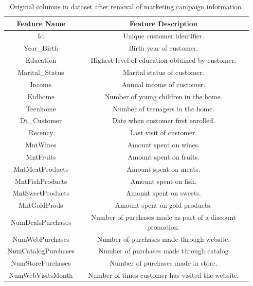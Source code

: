 \documentclass[twocolumn]{article}
\begin{document}
\begin{table}
    \centering
        \begin{tabular}{|c|c|}
            \hline
            \textbf{Feature Name} & \textbf{Feature Description} \\
            \hline
            Id & Unique customer identifier. \\
            Year\_Birth & Birth year of customer. \\
            Education & Highest level of education obtained by customer. \\
            Marital\_Status & Marital status of customer. \\
            Income & Annual income of customer. \\
            Kidhome & Number of young children in the home. \\
            Teenhome & Number of teenagers in the home. \\
            Dt\_Customer & Date when customer first enrolled. \\
            Recency & Last visit of customer. \\
            MntWines & Amount spent on wines. \\
            MntFruits & Amount spent on fruits. \\
            MntMeatProducts & Amount spent on meats. \\
            MntFishProducts & Amount spent on fish. \\
            MntSweetProducts & Amount spent on sweets. \\
            MntGoldProds & Amount spent on gold products. \\
            NumDealsPurchases & Number of purchases made as part of a discount promotion. \\
            NumWebPurchases & Number of purchases made through website. \\
            NumCatalogPurchases & Number of purchases made through catalog \\
            NumStorePurchases & Number of purchases made in store. \\
            NumWebVisitsMonth & Number of times customer has visited the website. \\
            \hline
        \end{tabular}
    \caption{Original columns in dataset after removal of marketing campaign information.}
\end{table}
\end{document}
